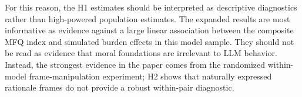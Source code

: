 For this reason, the H1 estimates should be interpreted as descriptive diagnostics rather than high-powered population estimates. The expanded results are most informative as evidence against a large linear association between the composite MFQ index and simulated burden effects in this model sample. They should not be read as evidence that moral foundations are irrelevant to LLM behavior. Instead, the strongest evidence in the paper comes from the randomized within-model frame-manipulation experiment; H2 shows that naturally expressed rationale frames do not provide a robust within-pair diagnostic.

\ifdefined\vslaMainDocument
\else


\fi

